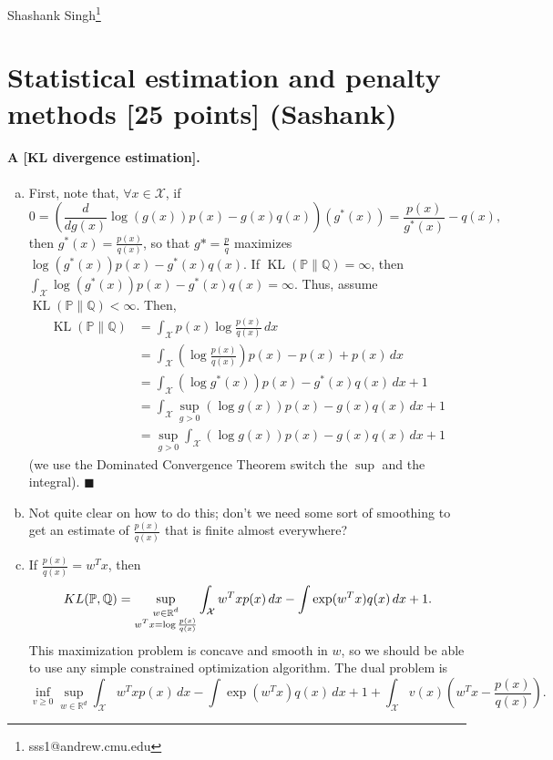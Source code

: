 \documentclass[11pt]{article}
\newcommand{\R}{\mathbb{R}}
\renewcommand{\P}{\mathbb{P}}
\newcommand{\Q}{\mathbb{Q}}
\newcommand{\X}{\mathcal{X}}
\renewcommand{\qed}{\quad \ensuremath{\blacksquare}}
\newcommand{\KL}{{\operatorname{KL}}}
\begin{document}
Shashank Singh\footnote{sss1@andrew.cmu.edu}
\setcounter{section}{3}

\section{Statistical estimation and penalty methods [25 points] (Sashank)}

\paragraph{A [KL divergence estimation].}
\begin{enumerate}[(a)]
\item First, note that, $\forall x \in \X$, if
\[0
    = \left( \frac{d}{dg(x)} \log(g(x))p(x) - g(x)q(x) \right) (g^*(x))
    = \frac{p(x)}{g^*(x)} - q(x),
\]
then $g^*(x) = \frac{p(x)}{q(x)}$, so that $g* = \frac{p}{q}$ maximizes
$\log(g^*(x))p(x) - g^*(x)q(x)$. If $\KL(\P\|\Q) = \infty$, then
$\int_\X \log(g^*(x))p(x) - g^*(x)q(x) = \infty$. Thus, assume
$\KL(\P\|\Q) < \infty$. Then,
\begin{align*}
\KL(\P\|\Q)
 &  = \int_\X p(x) \log \frac{p(x)}{q(x)} \, dx    \\
 &  = \int_\X \left( \log \frac{p(x)}{q(x)} \right) p(x) - p(x) + p(x) \, dx \\
 &  = \int_\X \left( \log g^*(x) \right) p(x) - g^*(x)q(x) \, dx + 1    \\
 &  = \int_\X \sup_{g > 0} \left( \log g(x) \right) p(x) - g(x)q(x) \, dx + 1\\
 &  = \sup_{g > 0} \int_\X \left( \log g(x) \right) p(x) - g(x)q(x) \, dx + 1
\end{align*}
(we use the Dominated Convergence Theorem switch the $\sup$ and the integral).
\qed
 
\item Not quite clear on how to do this; don't we need some sort of smoothing
to get an estimate of $\frac{p(x)}{q(x)}$ that is finite almost everywhere?
 
\item If $\frac{p(x)}{q(x)} = w^Tx$, then
\[KL(\P,\Q)
    = \sup_{
        \begin{subarray}{c}
            w \in \R^d\\
            w^Tx = \log \frac{p(x)}{q(x)}
        \end{subarray}} \int_\X w^Tx p(x) \, dx - \int\exp(w^Tx) q(x) \, dx + 1.
\]
This maximization problem is concave and smooth in $w$, so we should be able to
use any simple constrained optimization algorithm. The dual problem is
\[
\inf_{v \geq 0} \sup_{w \in \R^d}
    \int_\X w^Tx p(x) \, dx - \int\exp(w^Tx) q(x) \, dx + 1
        + \int_\X v(x)\left( w^Tx - \frac{p(x)}{q(x)} \right).
\]
\end{enumerate}
\end{document}
